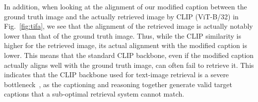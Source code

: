 \documentclass{article} \usepackage{iclr2024_conference,times}
\begin{document}
In addition, when looking at the alignment of our modified caption between the ground truth image and the actually retrieved image by CLIP (ViT-B/32) in Fig.~\ref{fig:tifa}, we see that the alignment of the retrieved image is actually notably lower than that of the ground truth image. 
Thus, while the CLIP similarity is higher for the retrieved image, its actual alignment with the modified caption is lower. This means that the standard CLIP backbone, even if the modified caption actually aligns well with the ground truth image, can often fail to retrieve it.
This indicates that the CLIP backbone used for text-image retrieval is a severe bottleneck~\citep{winoground,sugarcrepe,kamath2023text}, as the captioning and reasoning together generate valid target captions that a sub-optimal retrieval system cannot match.
\end{document}
